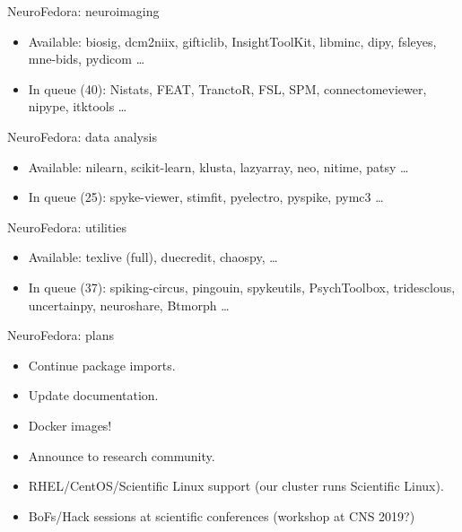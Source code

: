 \begin{frame}[c]{NeuroFedora: neuroimaging}
  \begin{itemize}
    \item Available: biosig, dcm2niix, gifticlib, InsightToolKit, libminc, dipy, fsleyes, mne-bids, pydicom \ldots
    \item In queue (40)\footnotemark: Nistats, FEAT, TranctoR, FSL, SPM, connectomeviewer, nipype, itktools \ldots
  \end{itemize}
\end{frame}
\begin{frame}[c]{NeuroFedora: data analysis}
  \begin{itemize}
    \item Available: nilearn, scikit-learn, klusta, lazyarray, neo, nitime, patsy \ldots
    \item In queue (25)\footnotemark: spyke-viewer, stimfit, pyelectro, pyspike, pymc3 \ldots
  \end{itemize}
\end{frame}
\begin{frame}[c]{NeuroFedora: utilities}
  \begin{itemize}
    \item Available: texlive (full), duecredit, chaospy, \ldots
    \item In queue (37)\footnotemark: spiking-circus, pingouin, spykeutils, PsychToolbox, tridesclous, uncertainpy, neuroshare, Btmorph \ldots
  \end{itemize}
\end{frame}
\begin{frame}[c]{NeuroFedora: plans}
  \begin{itemize}
    \item Continue package imports.
      \pause{}
    \item Update documentation\footnotemark.
      \pause{}
    \item Docker images\footnotemark!
      \pause{}
    \item Announce to research community.
      \pause{}
    \item RHEL/CentOS/Scientific Linux support (our cluster runs Scientific Linux).
      \pause{}
    \item BoFs/Hack sessions at scientific conferences (workshop at CNS 2019?)
  \end{itemize}
\end{frame}
